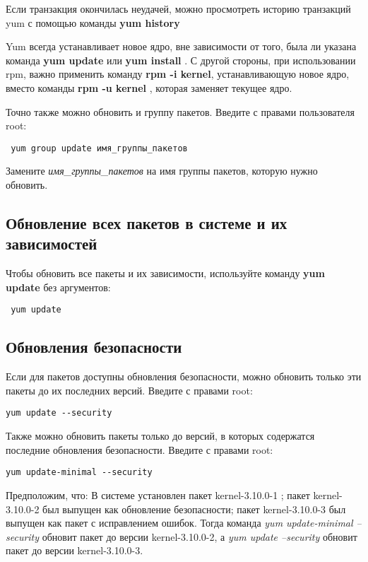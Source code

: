 \documentclass[a4paper,10pt,twoside]{article}
\begin{document}
Если транзакция окончилась неудачей, можно просмотреть историю транзакций yum с помощью команды \textbf{yum history} 


Yum всегда  устанавливает новое ядро, вне зависимости от того, была ли указана команда \textbf{yum update} или \textbf{yum install} . С другой стороны, при использовании rpm, важно применить команду \textbf{rpm -i kernel}, устанавливающую новое ядро, вместо команды \textbf{rpm -u kernel} , которая заменяет текущее ядро.

Точно также можно обновить и группу пакетов. Введите с правами пользователя root:
\begin{verbatim}
 yum group update имя_группы_пакетов
\end{verbatim} 

Замените \textit{имя\_группы\_пакетов} на имя группы пакетов, которую нужно обновить. 

\subsection{Обновление всех пакетов в системе и их зависимостей}
Чтобы обновить все пакеты и их зависимости, используйте команду \textbf{yum update} без аргументов:
\begin{verbatim}
 yum update
\end{verbatim}

\subsection{Обновления безопасности}
Если для пакетов доступны обновления безопасности, можно обновить только эти пакеты до их последних версий. Введите с правами root:
\begin{verbatim}
yum update --security
\end{verbatim} 

Также можно обновить пакеты только до версий, в которых содержатся последние обновления безопасности. Введите с правами root:
\begin{verbatim}
yum update-minimal --security
\end{verbatim} 

Предположим, что:
В системе установлен пакет kernel-3.10.0-1 ;
пакет kernel-3.10.0-2 был выпущен как обновление безопасности;
пакет kernel-3.10.0-3 был выпущен как пакет с исправлением ошибок.
Тогда команда \textit{yum update-minimal --security} обновит пакет до версии kernel-3.10.0-2, а \textit{yum update --security} обновит пакет до версии kernel-3.10.0-3.
\end{document}
